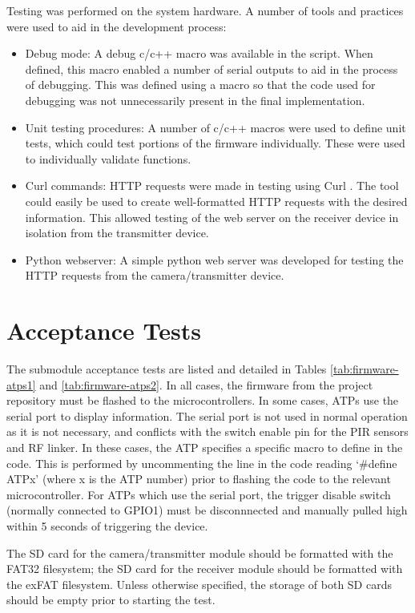 \documentclass[class=report,11pt,crop=false]{standalone}
\begin{document}
Testing was performed on the system hardware. A number of tools and practices were used to aid in the development process:

\begin{itemize}
    \item Debug mode: A debug c/c++ macro was available in the script. When defined, this macro enabled a number of serial outputs to aid in the process of debugging. This was defined using a macro so that the code used for debugging was not unnecessarily present in the final implementation.
    \item Unit testing procedures: A number of c/c++ macros were used to define unit tests, which could test portions of the firmware individually. These were used to individually validate functions.
    \item Curl commands: HTTP requests were made in testing using Curl \cite{hostetter1997curl}. The tool could easily be used to create well-formatted HTTP requests with the desired information. This allowed testing of the web server on the receiver device in isolation from the transmitter device.
    \item Python webserver: A simple python web server was developed for testing the HTTP requests from the camera/transmitter device.
\end{itemize}


\section{Acceptance Tests \label{s:firmware-atps}}

The submodule acceptance tests are listed and detailed in Tables \ref{tab:firmware-atps1} and \ref{tab:firmware-atps2}. In all cases, the firmware from the project repository must be flashed to the microcontrollers. In some cases, ATPs use the serial port to display information. The serial port is not used in normal operation as it is not necessary, and conflicts with the switch enable pin for the PIR sensors and RF linker.  In these cases, the ATP specifies a specific macro to define in the code. This is performed by uncommenting the line in the code reading `\#define ATPx' (where x is the ATP number) prior to flashing the code to the relevant microcontroller. For ATPs which use the serial port, the trigger disable switch (normally connected to GPIO1) must be disconnnected and manually pulled high within 5 seconds of triggering the device.

The SD card for the camera/transmitter module should be formatted with the FAT32 filesystem; the SD card for the receiver module should be formatted with the exFAT filesystem. Unless otherwise specified, the storage of both SD cards should be empty prior to starting the test.
\end{document}

